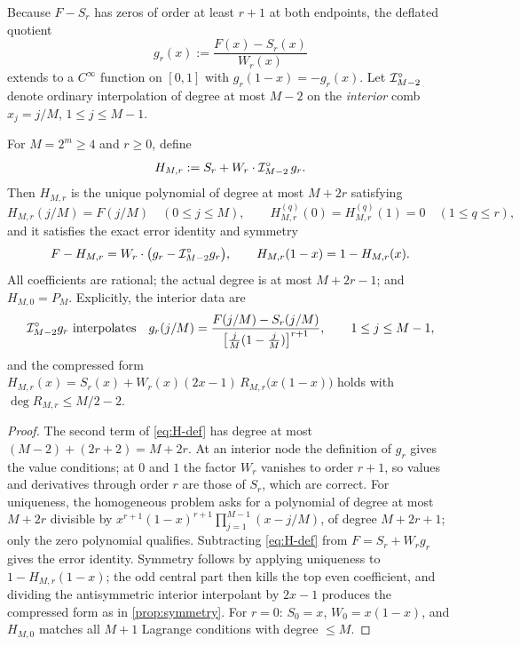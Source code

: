 Because $F-S_r$ has zeros of order at least $r+1$ at both endpoints,
the deflated quotient
\begin{equation}
 g_r(x):=\frac{F(x)-S_r(x)}{W_r(x)}
 \label{eq:def-g}
\end{equation}
extends to a $C^\infty$ function on $[0,1]$ with
$g_r(1-x)=-g_r(x)$.  Let $\mathcal I^{\circ}_{M-2}$ denote ordinary
interpolation of degree at most $M-2$ on the \emph{interior} comb
$x_j=j/M$, $1\le j\le M-1$.

\begin{theorem}
\label{thm:factorization}
For $M=2^{m}\ge4$ and $r\ge0$, define
\begin{equation}
 H_{M,r}:=S_r+W_r\cdot\mathcal I^{\circ}_{M-2}\,g_r.
 \label{eq:H-def}
\end{equation}
Then $H_{M,r}$ is the unique polynomial of degree at most $M+2r$
satisfying
\begin{equation}
 H_{M,r}(j/M)=F(j/M)\quad(0\le j\le M),
 \qquad
 H^{(q)}_{M,r}(0)=H^{(q)}_{M,r}(1)=0\quad(1\le q\le r),
 \label{eq:H-conditions}
\end{equation}
and it satisfies the exact error identity and symmetry
\begin{equation}
 F-H_{M,r}=W_r\cdot\bigl(g_r-\mathcal I^{\circ}_{M-2}g_r\bigr),
 \qquad
 H_{M,r}(1-x)=1-H_{M,r}(x).
 \label{eq:H-error-factor}
\end{equation}
All coefficients are rational; the actual degree is at most
$M+2r-1$; and $H_{M,0}=P_M$.  Explicitly, the interior data are
\begin{equation}
 \mathcal I^{\circ}_{M-2}g_r\ \text{interpolates}\quad
 g_r(j/M)=\frac{F(j/M)-S_r(j/M)}
 {\bigl[\tfrac jM(1-\tfrac jM)\bigr]^{r+1}},
 \qquad 1\le j\le M-1,
 \label{eq:quotient-data}
\end{equation}
and the compressed form
$H_{M,r}(x)=S_r(x)+W_r(x)(2x-1)\,
R_{M,r}\bigl(x(1-x)\bigr)$ holds with $\deg R_{M,r}\le M/2-2$.
\end{theorem}

\begin{proof}
The second term of \eqref{eq:H-def} has degree at most
$(M-2)+(2r+2)=M+2r$.  At an interior node the definition of
$g_r$ gives the value conditions; at $0$ and $1$ the factor $W_r$
vanishes to order $r+1$, so values and derivatives through order $r$
are those of $S_r$, which are correct.  For uniqueness, the
homogeneous problem asks for a polynomial of degree at most
$M+2r$ divisible by
$x^{r+1}(1-x)^{r+1}\prod_{j=1}^{M-1}(x-j/M)$, of degree
$M+2r+1$; only the zero polynomial qualifies.  Subtracting
\eqref{eq:H-def} from $F=S_r+W_rg_r$ gives the error identity.
Symmetry follows by applying uniqueness to $1-H_{M,r}(1-x)$; the odd
central part then kills the top even coefficient, and dividing the
antisymmetric interior interpolant by $2x-1$ produces the compressed
form as in \cref{prop:symmetry}.  For $r=0$: $S_0=x$,
$W_0=x(1-x)$, and $H_{M,0}$ matches all $M+1$ Lagrange conditions
with degree $\le M$.
\end{proof}

